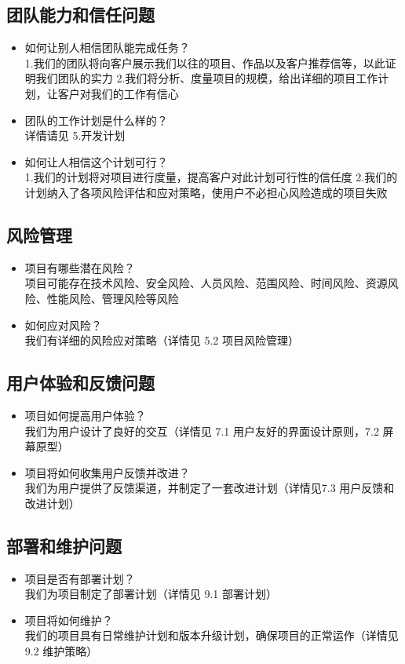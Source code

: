 \documentclass{article}
\begin{document}
\subsection{团队能力和信任问题}
\begin{itemize}
	\item 如何让别人相信团队能完成任务？\\
	1.我们的团队将向客户展示我们以往的项目、作品以及客户推荐信等，以此证明我们团队的实力
	2.我们将分析、度量项目的规模，给出详细的项目工作计划，让客户对我们的工作有信心
	\item 团队的工作计划是什么样的？\\
	详情请见 5.开发计划
	\item 如何让人相信这个计划可行？\\
	1.我们的计划将对项目进行度量，提高客户对此计划可行性的信任度
	2.我们的计划纳入了各项风险评估和应对策略，使用户不必担心风险造成的项目失败
\end{itemize}

\subsection{风险管理}
\begin{itemize}
	\item 项目有哪些潜在风险？\\
	项目可能存在技术风险、安全风险、人员风险、范围风险、时间风险、资源风险、性能风险、管理风险等风险
	\item 如何应对风险？\\
	我们有详细的风险应对策略（详情见 5.2 项目风险管理）
\end{itemize}

\subsection{用户体验和反馈问题}
\begin{itemize}
	\item 项目如何提高用户体验？\\
	我们为用户设计了良好的交互（详情见 7.1 用户友好的界面设计原则，7.2 屏幕原型）
	\item 项目将如何收集用户反馈并改进？\\
	我们为用户提供了反馈渠道，并制定了一套改进计划（详情见7.3 用户反馈和改进计划）
\end{itemize}

\subsection{部署和维护问题}
\begin{itemize}
	\item 项目是否有部署计划？\\
	我们为项目制定了部署计划（详情见 9.1 部署计划）
	\item 项目将如何维护？\\
	我们的项目具有日常维护计划和版本升级计划，确保项目的正常运作（详情见 9.2 维护策略）
\end{itemize}
\end{document}
